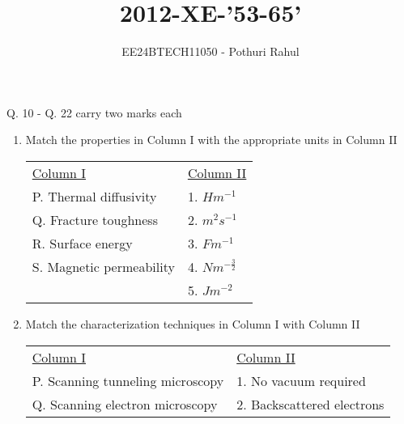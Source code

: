 \documentclass[journal]{IEEEtran}
\begin{document}

\vspace{3cm}
\title{2012-XE-'53-65'}
\author{EE24BTECH11050 - Pothuri Rahul}
{\let\newpage\relax\maketitle}
\renewcommand{\thefigure}{\theenumi}
\renewcommand{\thetable}{\theenumi}
\setlength{\intextsep}{10pt} %
\renewcommand{\thetable}{\theenumi}
Q. 10 - Q. 22 carry two marks each \\
\begin{enumerate}[start=10]
\item %
Match the properties in Column I with the appropriate units in Column II \\
\begin{tabular}{l l}
\underline{Column I} & \underline{Column II} \\
P. Thermal diffusivity   & 1. $Hm^{-1}$ \\
Q. Fracture toughness    & 2. $m^2s^{-1}$ \\
R. Surface energy        & 3. $Fm^{-1}$ \\
S. Magnetic permeability & 4. $Nm^{-\frac{3}{2}}$ \\
                        & 5. $Jm^{-2}$
\end{tabular}
\begin{enumerate}
\end{enumerate}
\item %
Match the characterization techniques in Column I with Column II \\
\begin{tabular}{l l}
\underline{Column I} & \underline{Column II} \\
P. Scanning tunneling microscopy & 1. No vacuum required \\
Q. Scanning electron microscopy & 2. Backscattered electrons \\

\end{tabular}
\end{enumerate}
\end{document}
